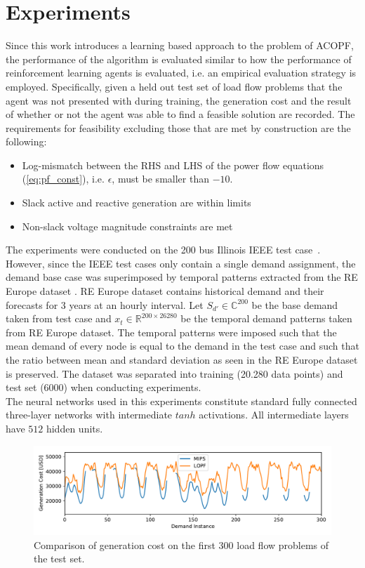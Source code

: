 \section{Experiments}
\label{sec:LOPFexperiments}
Since this work introduces a learning based approach to the problem of ACOPF, the performance of the algorithm is evaluated similar to how the performance of reinforcement learning agents is evaluated, i.e. an empirical evaluation strategy is employed. Specifically, given a held out test set of load flow problems that the agent was not presented with during training, the generation cost and the result of whether or not the agent was able to find a feasible solution are recorded. The requirements for feasibility excluding those that are met by construction are the following:
\begin{itemize}
    \item Log-mismatch between the RHS and LHS of the power flow equations (\ref{eq:pf_const}), i.e. $\epsilon$, must be smaller than $-10$.
    \item Slack active and reactive generation are within limits
    \item Non-slack voltage magnitude constraints are met
\end{itemize}

The experiments were conducted on the 200 bus Illinois IEEE test case~\cite{zimmerman1997matpower}. However, since the IEEE test cases only contain a single demand assignment, the demand base case was superimposed by temporal patterns extracted from the RE Europe dataset \cite{re_europe}. RE Europe dataset contains historical demand and their forecasts for 3 years at an hourly interval. Let $S_{d'} \in \mathbb{C}^{200}$ be the base demand taken from test case and $x_t \in \mathbb{R}^{200 \times 26280}$ be the temporal demand patterns taken from RE Europe dataset. The temporal patterns were imposed such that the mean demand of every node is equal to the demand in the test case and such that the ratio between mean and standard deviation as seen in the RE Europe dataset is preserved. The dataset was separated into training (20.280 data points) and test set (6000) when conducting experiments.\\
The neural networks used in this experiments constitute standard fully connected three-layer networks with intermediate $tanh$ activations. All intermediate layers have $512$ hidden units.

\begin{figure}[!ht]
    \centering
    \includegraphics[width=0.85\linewidth]{krtofl/cost_comapre_uart2.pdf}
    \caption[LOPF: Comparison of generation cost.]{Comparison of generation cost on the first 300 load flow problems of the test set.}
    \label{lopf:cost}
\end{figure}

